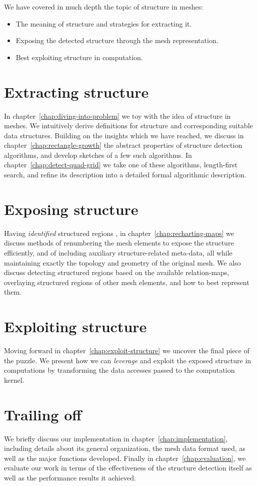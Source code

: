 We have covered in much depth the topic of structure in meshes:
\begin{itemize}
\item The meaning of structure and strategies for extracting it.
\item Exposing the detected structure through the mesh representation.
\item Best exploiting structure in computation.
\end{itemize}

\section{Extracting structure}
In chapter~\ref{chap:diving-into-problem} we toy with the idea of structure in meshes. We intuitively derive definitions for structure and corresponding suitable data structures. Building on the insights which we have reached, we discuss in chapter~\ref{chap:rectangle-growth} the abstract properties of structure detection algorithms, and develop sketches of a few such algorithms. In chapter~\ref{chap:detect-quad-grid} we take one of these algorithms, length-first search, and refine its description into a detailed formal algorithmic description.

\section{Exposing structure}
Having \emph{identified} structured regions , in chapter~\ref{chap:recharting-maps} we discuss methods of renumbering the mesh elements to expose the structure efficiently, and of including auxiliary structure-related meta-data, all while maintaining exactly the topology and geometry of the original mesh. We also discuss detecting structured regions based on the available relation-maps, overlaying structured regions of other mesh elements, and how to best represent them.

\section{Exploiting structure}
Moving forward in chapter~\ref{chap:exploit-structure} we uncover the final piece of the puzzle. We present how we can \emph{leverage} and exploit the exposed structure in computations by transforming the data accesses passed to the computation kernel.

\section{Trailing off}
We briefly discuss our implementation in chapter~\ref{chap:implementation}, including details about its general organization, the mesh data format used, as well as the major functions developed. Finally in chapter~\ref{chap:evaluation}, we evaluate our work in terms of the effectiveness of the structure detection itself as well as the performance results it achieved.
